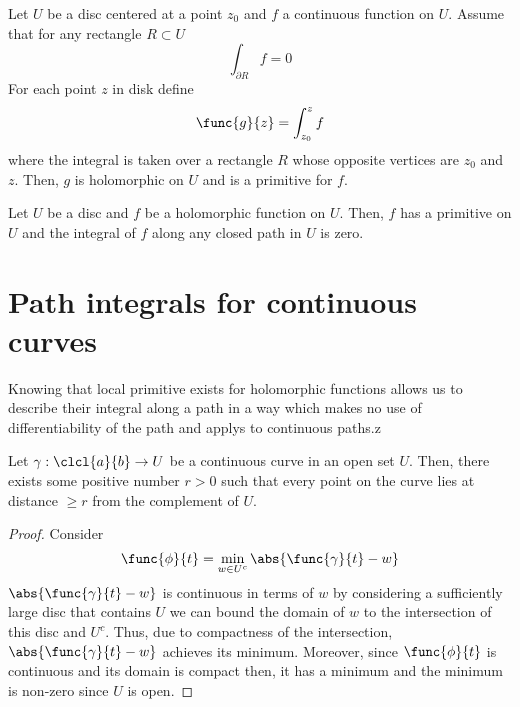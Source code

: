 \begin{theorem}
    Let \(U\) be a disc centered at a point \(z_0\) and \(f\) a continuous function on \(U\). Assume that for any rectangle \(R \subset U\)
    \begin{equation*}
        \int_{\partial R} f = 0
    \end{equation*}
    For each point \(z\) in disk define 
    \begin{equation*}
        \func{g}{z} = \int_{z_0}^z f
    \end{equation*}
    where the integral is taken over a rectangle \(R\) whose opposite vertices are \(z_0\) and \(z\). Then, \(g\) is holomorphic on \(U\) and is a primitive for \(f\).
\end{theorem}

\begin{theorem}
    Let \(U\) be a disc and \(f\) be a holomorphic function on \(U\). Then, \(f\) has a primitive on \(U\) and the integral of \(f\) along any closed path in \(U\) is zero.
\end{theorem}

\section{Path integrals for continuous curves}
Knowing that local primitive exists for holomorphic functions allows us to describe their integral along a path in a way which makes no use of differentiability of the path and applys to continuous paths.z

\begin{lemma}
    Let \(\gamma: \clcl{a}{b} \to U\) be a continuous curve in an open set \(U\). Then, there exists some positive number \(r > 0\) such that every point on the curve lies at distance \(\geq r\) from the complement of \(U\).
\end{lemma}

\begin{proof}
    Consider 
    \begin{equation*}
        \func{\phi}{t} = \min_{w \in U^c} \abs{\func{\gamma}{t} - w}
    \end{equation*}
    \(\abs{\func{\gamma}{t} - w}\) is continuous in terms of \(w\) by considering a sufficiently large disc that contains \(U\) we can bound the domain of \(w\) to the intersection of this disc and \(U^c\). Thus, due to compactness of the intersection, \(\abs{\func{\gamma}{t} - w}\) achieves its minimum. Moreover, since \(\func{\phi}{t}\) is continuous and its domain is compact then, it has a minimum and the minimum is non-zero since \(U\) is open.
\end{proof}

